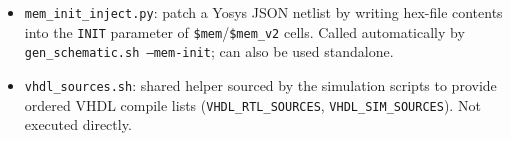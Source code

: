 \begin{itemize}[leftmargin=*]
  \item \texttt{mem\_init\_inject.py}: patch a Yosys JSON netlist by writing hex-file contents into the \texttt{INIT} parameter of \texttt{\$mem}/\texttt{\$mem\_v2} cells. Called automatically by \texttt{gen\_schematic.sh --mem-init}; can also be used standalone.
  \item \texttt{vhdl\_sources.sh}: shared helper sourced by the simulation scripts to provide ordered VHDL compile lists (\texttt{VHDL\_RTL\_SOURCES}, \texttt{VHDL\_SIM\_SOURCES}). Not executed directly.
\end{itemize}
